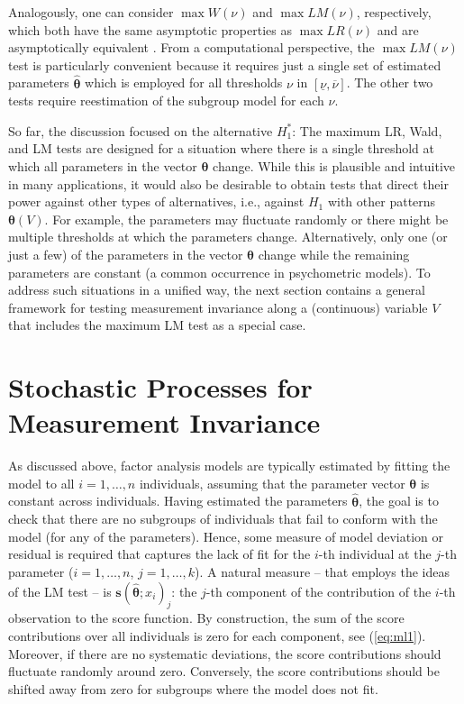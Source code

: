 \documentclass[man]{apa}
\begin{document}
Analogously, one can consider $\max W(\nu)$ and
$\max \mathit{LM}(\nu)$, respectively, which both have the same asymptotic properties
as $\max \mathit{LR}(\nu)$ and are asymptotically equivalent \cite{And93}.
From a computational perspective, the $\max \mathit{LM}(\nu)$ test is
particularly convenient 
because it requires just a single set of estimated parameters $\hat {\bm \theta}$
which is employed for all thresholds $\nu$ in $[\underline{\nu},
\overline{\nu}]$.  
The other two tests require reestimation of the subgroup model for each
$\nu$.

So far, the discussion focused on the alternative $H_1^*$: The maximum LR, Wald, and LM
tests are designed for a situation where there is a single threshold at which all
parameters in the vector ${\bm \theta}$ change. While this is plausible and intuitive
in many applications, it would also be desirable to obtain tests that direct their power
against other types of alternatives, i.e., against $H_1$ with other patterns ${\bm \theta}(V)$.
For example, the parameters may fluctuate randomly or there might be multiple thresholds
at which the parameters change. Alternatively, only one (or just a few) of the parameters in
the vector ${\bm \theta}$ change while the remaining parameters are
constant (a common occurrence in psychometric models).
To address such situations in a unified way, the next section contains 
a general framework for testing measurement invariance along a
(continuous) variable $V$ that
includes the maximum LM test as a special case.


\section{Stochastic Processes for Measurement Invariance}

As discussed above, factor analysis models are typically
estimated by fitting the model to all $i = 1, \dots, n$ individuals, assuming
that the parameter vector ${\bm \theta}$ is constant across individuals.
Having estimated the parameters $\hat {\bm \theta}$, the goal is to check that
there are no subgroups of individuals that fail to conform with the model (for any
of the parameters). Hence, some measure of model deviation or residual is required
that captures the lack of fit for the $i$-th individual at the $j$-th parameter
($i = 1, \dots, n$, $j = 1, \dots, k$). A natural measure -- that employs the ideas
of the LM test -- is ${\bm s}(\hat {\bm \theta}; x_i)_j$: the $j$-th component of the
contribution of the $i$-th observation to the score function. By construction, the sum
of the score contributions over all individuals is zero for each
component, see
(\ref{eq:ml1}). Moreover, if there are no systematic deviations, the score contributions
should fluctuate randomly around zero.  Conversely, the score
contributions should be shifted away from zero for
subgroups where the model does not fit.
\end{document}
